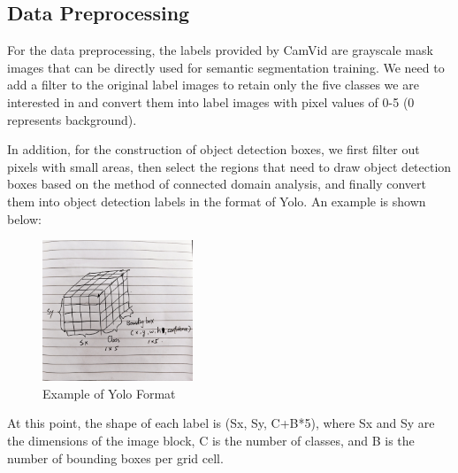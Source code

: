 \documentclass[conference]{IEEEtran}
\begin{document}
\subsection{Data Preprocessing}

For the data preprocessing, the labels provided by CamVid are grayscale mask images that can be directly used for semantic segmentation training. We need to add a filter to the original label images to retain only the five classes we are interested in and convert them into label images with pixel values of 0-5 (0 represents background).


In addition, for the construction of object detection boxes, we first filter out pixels with small areas, then select the regions that need to draw object detection boxes based on the method of connected domain analysis, and finally convert them into object detection labels in the format of Yolo. An example is shown below:

\begin{figure}[htbp]
    \centerline{\includegraphics[width=0.4\textwidth]{fig/yolo_format.jpg}}
    \caption{Example of Yolo Format}
    \label{fig:format}
\end{figure}


At this point, the shape of each label is (Sx, Sy, C+B*5), where Sx and Sy are the dimensions of the image block, C is the number of classes, and B is the number of bounding boxes per grid cell.
\end{document}
